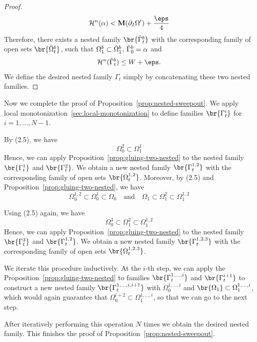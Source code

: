 \begin{proposition}
\begin{proof}
        \begin{equation*}
            \mathcal{H}^n(\alpha) < \mathbf{M}(\partial_I\Omega') + \frac{\eps}{4}
        \end{equation*}
        Therefore, there exists a nested family $\br{\Tilde{\Gamma}_t^b}$ with the corresponding family of open sets $\br{\Tilde{\Omega}_t^b}$, such that $\Omega_1^b \subset \Tilde{\Omega}_1^b$, $\Tilde{\Gamma}_0^b = \alpha$ and
        \begin{equation*}
            \mathcal{H}^n(\Tilde{\Gamma}_t^b) \leq W + \eps.
        \end{equation*}
        We define the desired nested family $\Gamma_t$ simply by concatenating these two nested families.
    \end{proof}
\end{proposition}
Now we complete the proof of Proposition~\ref{prop:nested-sweepout}. We apply local monotonization~\ref{sec:local-monotonization} to define families $\br{\Gamma_t^i}$ for $i = 1, \dots, N - 1$.

By (2.5), we have
\begin{equation*}
    \Omega_0^2 \subset \Omega_1^1
\end{equation*}
Hence, we can apply Proposition~\ref{prop:gluing-two-nested} to the nested family $\br{\Gamma_t^1}$ and $\br{\Gamma_t^2}$. We obtain a new nested family $\br{\Gamma_t^{1, 2}}$ with the corresponding family of open sets $\br{\Omega_t^{1, 2}}$. Moreover, by (2.5) and Proposition~\ref{prop:gluing-two-nested}, we have
\begin{equation*}
    \Omega_0^{1, 2} \subset \Omega_0^1 \subset \Omega_0 \quad\text{and}\quad\Omega_1 \subset \Omega_1^2 \subset \Omega_1^{1, 2}
\end{equation*}

Using (2.5) again, we have
\begin{equation*}
    \Omega_0^3 \subset \Omega_1^2 \subset \Omega_1^{1, 2}
\end{equation*}
Hence, we can apply Proposition~\ref{prop:gluing-two-nested} to the nested family $\br{\Gamma_t^3}$ and $\br{\Gamma_t^{1, 2}}$. We obtain a new nested family $\br{\Gamma_t^{1, 2, 3}}$ with the corresponding family of open sets $\br{\Omega_t^{1, 2, 3}}$.

We iterate this procedure inductively. At the $i$-th step, we can apply the Proposition~\ref{prop:gluing-two-nested} to families $\br{\Gamma_t^{1, \dots, i}}$ and $\br{\Gamma_t^{i+1}}$ to construct a new nested family $\br{\Gamma_t^{1, \dots, i, i + 1}}$ with $\Omega_0^{1, \dots, i}$ and $\br{\Omega_1} \subset \Omega_1^{1, \dots, i}$, which would again guarantee that $\Omega_0^{i + 2} \subset \Omega_1^{1, \dots, i}$, so that we can go to the next step.

After iteratively performing this operation $N$ times we obtain the desired nested family. This finishes the proof of Proposition~\ref{prop:nested-sweepout}.
